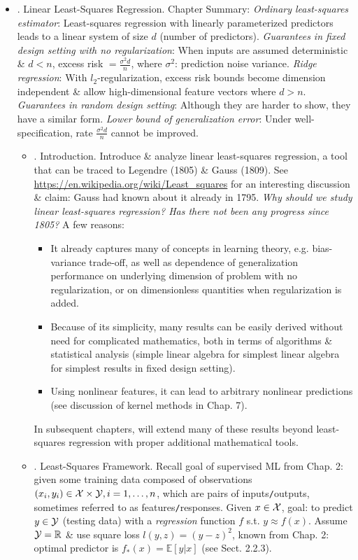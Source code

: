 \documentclass{article}
\begin{document}
\begin{enumerate}
\begin{itemize}
\begin{itemize}
\begin{itemize}
			\end{itemize}
		\end{itemize}
		\item {. Linear Least-Squares Regression.} Chapter Summary: {\it Ordinary least-squares estimator}: Least-squares regression with linearly parameterized predictors leads to a linear system of size $d$ (number of predictors). {\it Guarantees in fixed design setting with no regularization}: When inputs are assumed deterministic \& $d < n$, excess risk $= \frac{\sigma^2d}{n}$, where $\sigma^2$: prediction noise variance. {\it Ridge regression}: With $l_2$-regularization, excess risk bounds become dimension independent \& allow high-dimensional feature vectors where $d > n$. {\it Guarantees in random design setting}: Although they are harder to show, they have a similar form. {\it Lower bound of generalization error}: Under well-specification, rate $\frac{\sigma^2d}{n}$ cannot be improved.
		\begin{itemize}
			\item {. Introduction.} Introduce \& analyze linear least-squares regression, a tool that can be traced to Legendre (1805) \& Gauss (1809). See \url{https://en.wikipedia.org/wiki/Least_squares} for an interesting discussion \& claim: {\sc Gauss} had known about it already in 1795. {\it Why should we study linear least-squares regression? Has there not been any progress since 1805?} A few reasons:
			\begin{itemize}
				\item It already captures many of concepts in learning theory, e.g. bias-variance trade-off, as well as dependence of generalization performance on underlying dimension of problem with no regularization, or on dimensionless quantities when regularization is added.
				\item Because of its simplicity, many results can be easily derived without need for complicated mathematics, both in terms of algorithms \& statistical analysis (simple linear algebra for simplest linear algebra for simplest results in fixed design setting).
				\item Using nonlinear features, it can lead to arbitrary nonlinear predictions (see discussion of kernel methods in Chap. 7).
			\end{itemize}
			In subsequent chapters, will extend many of these results beyond least-squares regression with proper additional mathematical tools.
			\item {. Least-Squares Framework.} Recall goal of supervised ML from Chap. 2: given some training data composed of observations $(x_i,y_i)\in{\cal X}\times{\cal Y},i = 1,\ldots,n$, which are pairs of inputs{\tt/}outputs, sometimes referred to as features{\tt/}responses. Given $x\in{\cal X}$, goal: to predict $y\in{\cal Y}$ (testing data) with a {\it regression} function $f$ s.t. $y\approx f(x)$. Assume ${\cal Y} = \mathbb{R}$ \& use square loss $l(y,z) = (y - z)^2$, known from Chap. 2: optimal predictor is $f_*(x) = \mathbb{E}[y|x]$ (see Sect. 2.2.3).
			

\end{itemize}
\end{itemize}
\end{enumerate}
\end{document}
